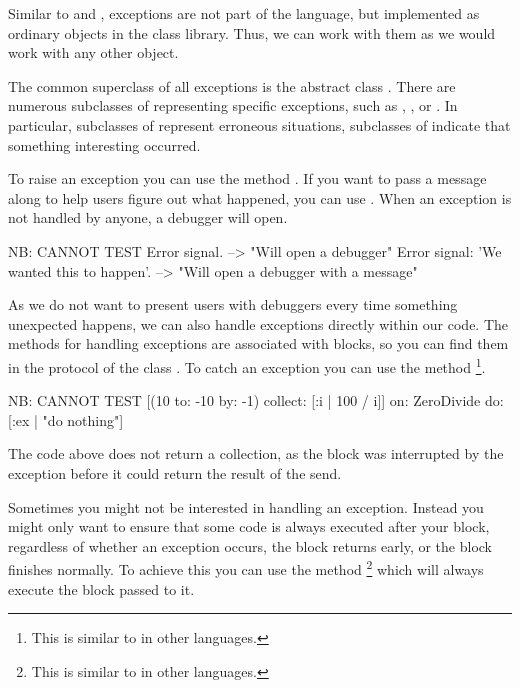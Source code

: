 \documentclass[a4paper,10pt,twoside]{book}
\begin{document}
Similar to  and , exceptions are not part of the language, but implemented as ordinary objects in the class library. 
Thus, we can work with them as we would work with any other object.

The common superclass of all exceptions is the abstract class .
There are numerous subclasses of  representing specific exceptions, such as , , or .
In particular, subclasses of  represent erroneous situations, subclasses of  indicate that something interesting occurred.

To raise an exception you can use the method .
If you want to pass a message along to help users figure out what happened, you can use .
When an exception is not handled by anyone, a debugger will open.

\begin{code}{NB: CANNOT TEST}
Error signal. --> "Will open a debugger"
Error signal: 'We wanted this to happen'. --> "Will open a debugger with a message"
\end{code}

As we do not want to present users with debuggers every time something unexpected happens, we can also handle exceptions directly within our code.
The methods for handling exceptions are associated with blocks, so you can find them in the  protocol of the class .
To catch an exception you can use the method \footnote{This is similar to  in other languages.}.

\begin{code}{NB: CANNOT TEST}
[(10 to: -10 by: -1) collect: [:i | 100 / i]] 
   on: ZeroDivide
   do: [:ex | "do nothing"]
\end{code}

The code above does not return a collection, as the block was interrupted by the  exception before it could return the result of the  send.

Sometimes you might not be interested in handling an exception. 
Instead you might only want to ensure that some code is always executed after your block, regardless of whether an exception occurs, the block returns early, or the block finishes normally.
To achieve this you can use the method \footnote{This is similar to  in other languages.} which will always execute the block passed to it.
\end{document}
